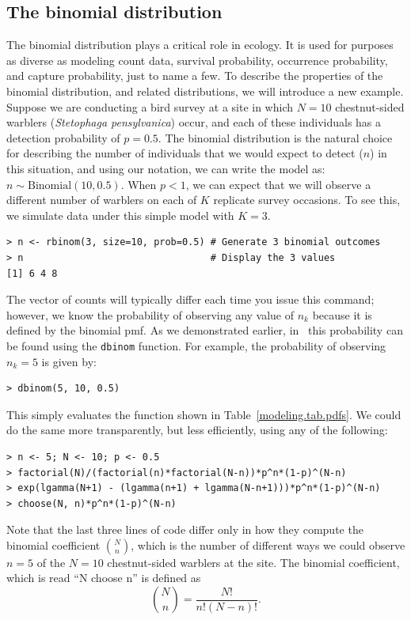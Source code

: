 \subsection{The binomial distribution}

The binomial distribution plays a critical role in ecology. It is
used for purposes as diverse as modeling count data, survival
probability, occurrence probability, and capture probability, just to
name a few.
To describe the properties of the binomial distribution, and related
distributions, we will introduce a new example.
Suppose we are conducting a bird survey at a site in which $N=10$
chestnut-sided warblers (\textit{Stetophaga pensylvanica}) occur, and
each of these individuals has a detection probability of $p=0.5$. The
binomial distribution is the natural choice for describing the number
of individuals that we would expect to detect ($n$) in this
situation, and using our notation, we can write the model as: $n \sim
\text{Binomial}(10, 0.5)$. When $p<1$, we can expect that we will observe
a different number of warblers on each of $K$ replicate survey
occasions. To see this,
we simulate data under this simple model with $K=3$.
\begin{verbatim}
> n <- rbinom(3, size=10, prob=0.5) # Generate 3 binomial outcomes
> n                                 # Display the 3 values
[1] 6 4 8
\end{verbatim}
The vector of counts will typically differ each time you issue this
command; however, we know the probability of observing any value of
$n_k$ because it is defined by the binomial pmf. As we demonstrated
earlier, in \R~this probability can be found using the \verb+dbinom+
function. For example, the probability of observing $n_k=5$ is given by:
\begin{verbatim}
> dbinom(5, 10, 0.5)
\end{verbatim}
This simply evaluates the function shown in
Table~\ref{modeling.tab.pdfs}. We could do the same more transparently, but
less efficiently, using any of the following:
\begin{verbatim}
> n <- 5; N <- 10; p <- 0.5
> factorial(N)/(factorial(n)*factorial(N-n))*p^n*(1-p)^(N-n)
> exp(lgamma(N+1) - (lgamma(n+1) + lgamma(N-n+1)))*p^n*(1-p)^(N-n)
> choose(N, n)*p^n*(1-p)^(N-n)
\end{verbatim}
Note that the last three lines of code differ only in how they compute the
binomial coefficient $\binom{N}{n}$, which is the number of different ways
we could observe $n=5$ of the $N=10$ chestnut-sided warblers at the site. The
binomial coefficient, which is read ``N choose n'' is defined as
\begin{equation}
  \label{eq:1}
  \binom{N}{n} = \frac{N!}{n!(N-n)!}.
\end{equation}


